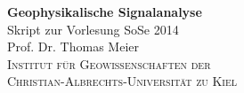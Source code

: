 \begin{titlepage}
\begin{center}
\vspace*{2cm}
\Huge
\textbf{Geophysikalische Signalanalyse} \\[2cm]
\LARGE
Skript zur Vorlesung SoSe 2014\\[3cm]
\Large
Prof. Dr. Thomas Meier \\[8cm]
\textsc{Institut für Geowissenschaften der\\Christian-Albrechts-Universität zu Kiel}
\end{center}
\end{titlepage} 